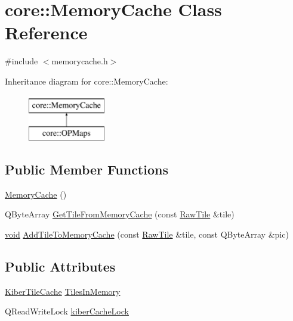\hypertarget{classcore_1_1_memory_cache}{\section{core\-:\-:Memory\-Cache Class Reference}
\label{classcore_1_1_memory_cache}
}


{\ttfamily \#include $<$memorycache.\-h$>$}

Inheritance diagram for core\-:\-:Memory\-Cache\-:\begin{figure}[H]
\begin{center}
\leavevmode
\includegraphics[height=2.000000cm]{classcore_1_1_memory_cache}
\end{center}
\end{figure}
\subsection*{Public Member Functions}
\begin{DoxyCompactItemize}
\item 
\hyperlink{group___o_p_map_widget_gacf3985e0ad4b9b8ec8753ba08bbfe5d4}{Memory\-Cache} ()
\item 
Q\-Byte\-Array \hyperlink{group___o_p_map_widget_ga7a264bbfd35c0236a10afa3c474e689b}{Get\-Tile\-From\-Memory\-Cache} (const \hyperlink{classcore_1_1_raw_tile}{Raw\-Tile} \&tile)
\item 
\hyperlink{group___u_a_v_objects_plugin_ga444cf2ff3f0ecbe028adce838d373f5c}{void} \hyperlink{group___o_p_map_widget_ga6a459355ac3d41deedd783f9bef0ada8}{Add\-Tile\-To\-Memory\-Cache} (const \hyperlink{classcore_1_1_raw_tile}{Raw\-Tile} \&tile, const Q\-Byte\-Array \&pic)
\end{DoxyCompactItemize}
\subsection*{Public Attributes}
\begin{DoxyCompactItemize}
\item 
\hyperlink{classcore_1_1_kiber_tile_cache}{Kiber\-Tile\-Cache} \hyperlink{group___o_p_map_widget_gaeb53ae92c08d2646f4ecbcf764e7e226}{Tiles\-In\-Memory}
\item 
Q\-Read\-Write\-Lock \hyperlink{group___o_p_map_widget_ga9c5f2537ff4510c8890590e73ea95b65}{kiber\-Cache\-Lock}
\end{DoxyCompactItemize}


